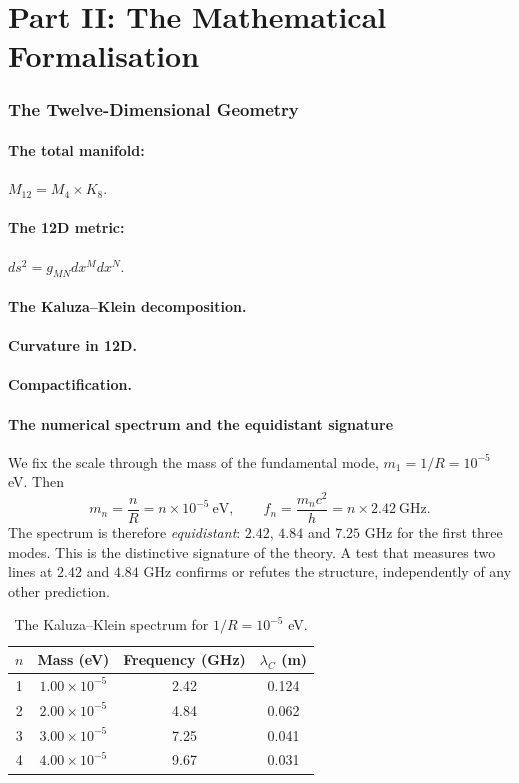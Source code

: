 \part*{Part II: The Mathematical Formalisation}

\section{The Twelve-Dimensional Geometry}
\subsection{The total manifold:} $M_{12} = M_4 \times K_8$.
\subsection{The 12D metric:} $ds^2 = g_{MN} dx^M dx^N$.
\subsection{The Kaluza--Klein decomposition.}
\subsection{Curvature in 12D.}
\subsection{Compactification.}

\subsection{The numerical spectrum and the equidistant signature}
We fix the scale through the mass of the fundamental mode, $m_1 = 1/R = 10^{-5}$ eV. Then
\begin{equation}
m_n = \frac{n}{R} = n \times 10^{-5}\ \text{eV},
\qquad
f_n = \frac{m_n c^2}{h} = n \times 2.42\ \text{GHz}.
\end{equation}
The spectrum is therefore \emph{equidistant}: $2.42$, $4.84$ and $7.25$ GHz for the first three modes. This is the distinctive signature of the theory. A test that measures two lines at $2.42$ and $4.84$ GHz confirms or refutes the structure, independently of any other prediction.

\begin{table}[H]
\centering
\begin{tabular}{@{}cccc@{}}
\toprule
$n$ & Mass (eV) & Frequency (GHz) & $\lambda_C$ (m) \\ \midrule
1 & $1.00\times10^{-5}$ & 2.42 & 0.124 \\
2 & $2.00\times10^{-5}$ & 4.84 & 0.062 \\
3 & $3.00\times10^{-5}$ & 7.25 & 0.041 \\
4 & $4.00\times10^{-5}$ & 9.67 & 0.031 \\ \bottomrule
\end{tabular}
\caption{The Kaluza--Klein spectrum for $1/R = 10^{-5}$ eV.}
\label{tab:spectru}
\end{table}

